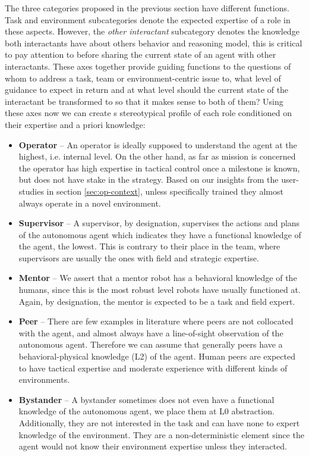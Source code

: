 \documentclass[letterpaper, 10 pt, conference]{ieeeconf}  %
\theoremstyle{definition}
\begin{document}
{The three categories proposed in the previous section have different functions.
Task and environment subcategories denote the expected expertise of a role in these aspects.
However, the \textit{other interactant} subcategory denotes the knowledge both interactants have about others behavior and reasoning model, this is critical to pay attention to before sharing the current state of an agent with other interactants.
These axes together provide guiding functions to the questions of whom to address a task, team or environment-centric issue to, what level of guidance to expect in return and at what level should the current state of the interactant be transformed to so that it makes sense to both of them?
Using these axes now we can create s stereotypical profile of each role conditioned on their expertise and a priori knowledge:
\begin{itemize}
    \item \textbf{Operator} -- An operator is ideally supposed to understand the agent at the highest, i.e. internal level. On the other hand, as far as mission is concerned the operator has high expertise in tactical control once a milestone is known, but does not have stake in the strategy. Based on our insights from the user-studies in section \ref{sec:op-context}, unless specifically trained they almost always operate in a novel environment.
    \item \textbf{Supervisor} -- A supervisor, by designation, supervises the actions and plans of the autonomous agent which indicates they have a functional knowledge of the agent, the lowest. This is contrary to their place in the team, where supervisors are usually the ones with field and strategic expertise.
    \item \textbf{Mentor} -- We assert that a mentor robot has a behavioral knowledge of the humans, since this is the most robust level robots have usually functioned at. Again, by designation, the mentor is expected to be a task and field expert.
    \item \textbf{Peer} -- There are few examples in literature where peers are not collocated with the agent, and almost always have a line-of-sight observation of the autonomous agent. Therefore we can assume that generally peers have a behavioral-physical knowledge (L2) of the agent. Human peers are expected to have tactical expertise and moderate experience with different kinds of environments.
    \item \textbf{Bystander} -- A bystander sometimes does not even have a functional knowledge of the autonomous agent, we place them at L0 abstraction. Additionally, they are not interested in the task and can have none to expert knowledge of the environment. They are a non-deterministic element since the agent would not know their environment expertise unless they interacted.

\end{itemize}}
\end{document}
